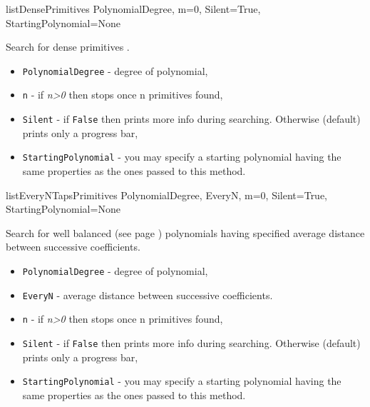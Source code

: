  {listDensePrimitives} {PolynomialDegree, m=0, Silent=True, StartingPolynomial=None} {
	Search for dense primitives \cite{lfsr:dense}.
	\begin{itemize}
		\item \texttt{PolynomialDegree} - degree of polynomial,
		\item \texttt{n} - if \textit{n>0} then stops once n primitives found,
		\item \texttt{Silent} - if \texttt{False} then prints more info during searching. Otherwise (default) prints only a progress bar,
		\item \texttt{StartingPolynomial} - you may specify a starting polynomial having the same properties as the ones passed to this method.
	\end{itemize}
}

 {listEveryNTapsPrimitives} {PolynomialDegree, EveryN, m=0, Silent=True, StartingPolynomial=None} {
	Search for well balanced (see page \pageref{polynomial:getbalancing}) polynomials having specified average distance between successive coefficients.
	\begin{itemize}
		\item \texttt{PolynomialDegree} - degree of polynomial,
		\item \texttt{EveryN} - average distance between successive coefficients.
		\item \texttt{n} - if \textit{n>0} then stops once n primitives found,
		\item \texttt{Silent} - if \texttt{False} then prints more info during searching. Otherwise (default) prints only a progress bar,
		\item \texttt{StartingPolynomial} - you may specify a starting polynomial having the same properties as the ones passed to this method.
	\end{itemize}
}

